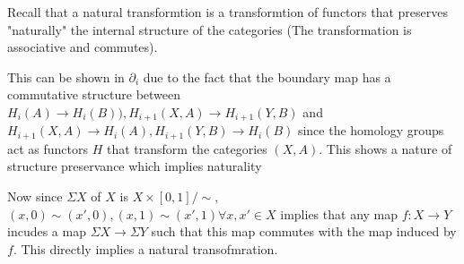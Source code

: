 \documentclass[12pt]{amsart}
\begin{document}
  \begin{problem}[Problem 6]
     Recall that a natural transformtion is a transformtion of functors that preserves "naturally" the internal structure of the categories (The transformation is associative and commutes). 

     This can be shown in $\partial_i$ due to the fact that the boundary map has a commutative structure between $H_i(A)\to H_i(B)), H_{i+1}(X,A)\to H_{i+1}(Y,B)$ and $H_{i+1}(X,A)\to H_i(A), H_{i+1}(Y,B) \to H_i(B)$ since the homology groups act as functors $H$ that transform the categories $(X,A)$. This shows a nature of structure preservance which implies naturality 

     Now since $\Sigma X$ of $X$ is $X\times [0,1]/\sim $, $(x,0)\sim (x',0), (x,1)\sim(x',1)\forall x, x'\in X$ implies that any map $f: X\to Y$ incudes a map $\Sigma X\to \Sigma Y$ such that this map commutes with the map induced by $f$. This directly implies a natural transofmration. 
  \end{problem}
  
\end{document}
